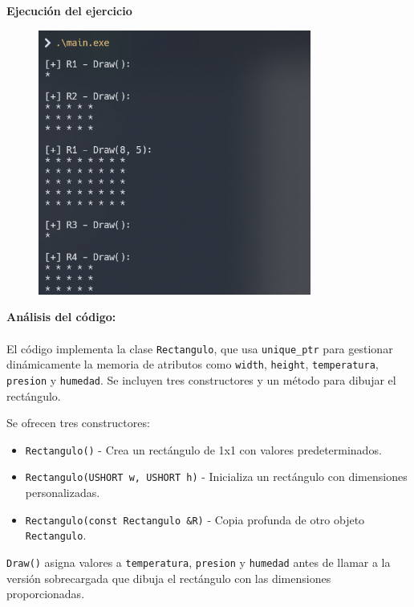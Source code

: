 \documentclass{article}
\begin{document}
        \textbf{Ejecución del ejercicio}
        \begin{figure}[H]
        	\centering
         	\includegraphics[width=0.8\textwidth,keepaspectratio]{img/ejercicio1.png}
        \end{figure}

        \textbf{Análisis del código:} \\\\
        El código implementa la clase \texttt{Rectangulo}, que usa \texttt{unique\_ptr} para gestionar dinámicamente la memoria de atributos como \texttt{width}, \texttt{height}, \texttt{temperatura}, \texttt{presion} y \texttt{humedad}. Se incluyen tres constructores y un método para dibujar el rectángulo.
        
        Se ofrecen tres constructores:
        \begin{itemize}
            \item \texttt{Rectangulo()} - Crea un rectángulo de 1x1 con valores predeterminados.
            \item \texttt{Rectangulo(USHORT w, USHORT h)} - Inicializa un rectángulo con dimensiones personalizadas.
            \item \texttt{Rectangulo(const Rectangulo \&R)} - Copia profunda de otro objeto \texttt{Rectangulo}.
        \end{itemize}
        
        \texttt{Draw()} asigna valores a \texttt{temperatura}, \texttt{presion} y \texttt{humedad} antes de llamar a la versión sobrecargada que dibuja el rectángulo con las dimensiones proporcionadas.
        
\end{document}

